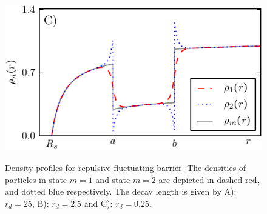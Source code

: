 \begin{minipage}[t]{0.5 \textwidth}
    \begin{figure}[H]
        \includegraphics[width = 1 \textwidth]{plots/d3.pdf}
    \end{figure}
\end{minipage}\hspace{0.02\textwidth}\begin{minipage}[t]{0.48 \textwidth}
    \begin{figure}[H]
        \caption{Density profiles for repulsive fluctuating barrier. The densities of particles in state $m=1$ and state $m=2$ are depicted in dashed red, and dotted blue respectively. The decay length is given by A): $r_d = 25$, B): $r_d=2.5$ and C): $r_d=0.25$. \label{rep_symm_dens_profile}}
    \end{figure}
\end{minipage}


